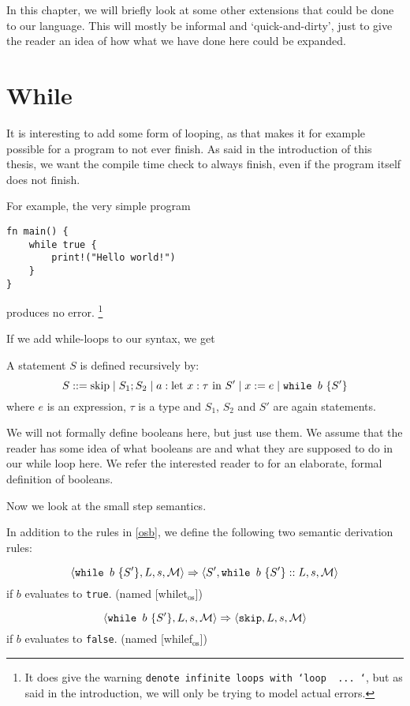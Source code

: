 In this chapter, we will briefly look at some other extensions that could be done to our language. This will mostly be informal and `quick-and-dirty', just to give the reader an idea of how what we have done here could be expanded. 

\section{While}
It is interesting to add some form of looping, as that makes it for example possible for a program to not ever finish. As said in the introduction of this thesis, we want the compile time check to always finish, even if the program itself does not finish. 

For example, the very simple program 

\begin{verbatim}
fn main() {
    while true {
        print!("Hello world!")
    }
}
\end{verbatim}

produces no error. \footnote{It does give the warning \texttt{denote infinite loops with `loop { ... }`}, but as said in the introduction, we will only be trying to model actual errors.}

If we add while-loops to our syntax, we get 

\begin{definition}
\label{statementswhile}
A statement $S$ is defined recursively by:
$$S ::= \textrm{skip} \mid S_1; S_2 \mid a: \textrm{let } x:\tau \textrm{ in } S' \mid x := e \mid \texttt{while } b~ \{ S' \}$$
where $e$ is an expression, $\tau$ is a type and $S_1$, $S_2$ and $S'$ are again statements.
\end{definition}

We will not formally define booleans here, but just use them. We assume that the reader has some idea of what booleans are and what they are supposed to do in our while loop here. We refer the interested reader to \cite{nielson1992semantics} for an elaborate, formal definition of booleans.

Now we look at the small step semantics.

\begin{definition}
\label{oswhile}
In addition to the rules in \ref{osb}, we define the following two semantic derivation rules:

$$\langle \texttt{while } b~ \{ S' \}, L, s, \mathcal{M} \rangle \Rightarrow \langle S', \texttt{while } b~ \{ S' \}::L, s, \mathcal{M} \rangle$$ 
if $b$ evaluates to \texttt{true}. (named [whilet$_{\textrm{os}}$])

$$\langle \texttt{while } b~ \{ S' \}, L, s, \mathcal{M} \rangle \Rightarrow \langle \texttt{skip}, L, s, \mathcal{M} \rangle$$ 
if $b$ evaluates to \texttt{false}. (named [whilef$_{\textrm{os}}$])
\end{definition}

